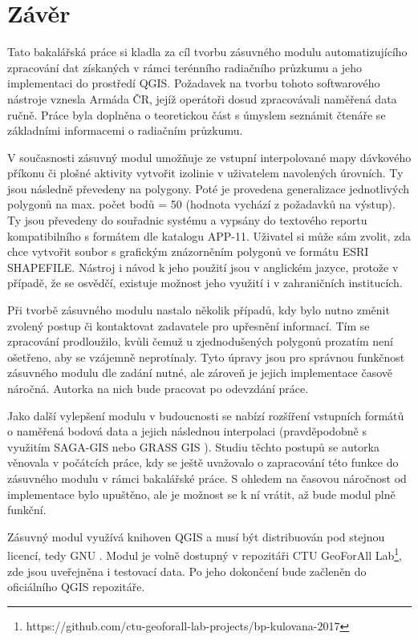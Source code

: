 \chapter{Závěr}
\label{5-zaver}


Tato bakalářská práce si kladla za cíl tvorbu zásuvného modulu
automatizujícího zpracování dat získaných v rámci terénního radiačního
průzkumu a jeho implementaci do prostředí QGIS. Požadavek na tvorbu
tohoto softwarového nástroje vznesla Armáda ČR, jejíž operátoři dosud
zpracovávali naměřená data ručně. Práce byla doplněna o teoretickou
část s úmyslem seznámit čtenáře se základními informacemi o radiačním
průzkumu.

V současnosti zásuvný modul umožňuje ze vstupní interpolované mapy
dávkového příkonu či plošné aktivity vytvořit izolinie v uživatelem
navolených úrovních. Ty jsou následně převedeny na polygony. Poté je
provedena generalizace jednotlivých polygonů na max. počet bodů = 50
(hodnota vychází z požadavků na výstup). Ty jsou převedeny do
souřadnic systému  a vypsány do textového reportu
kompatibilního s formátem dle katalogu APP-11. Uživatel si může sám
zvolit, zda chce vytvořit soubor s grafickým znázorněním polygonů ve
formátu ESRI SHAPEFILE. Nástroj i návod k jeho použití jsou v
anglickém jazyce, protože v případě, že se osvědčí, existuje možnost
jeho využití i v zahraničních institucích.

Při tvorbě zásuvného modulu nastalo několik případů, kdy bylo nutno
změnit zvolený postup či kontaktovat zadavatele pro upřesnění
informací. Tím se zpracování prodloužilo, kvůli čemuž u zjednodušených
polygonů prozatím není ošetřeno, aby se vzájemně neprotínaly. Tyto
úpravy jsou pro správnou funkčnost zásuvného modulu dle zadání nutné,
ale zároveň je jejich implementace časově náročná. Autorka na nich
bude pracovat po odevzdání práce.

Jako další vylepšení modulu v budoucnosti se nabízí rozšíření
vstupních formátů o naměřená bodová data a jejich následnou
interpolaci (pravděpodobně s využitím SAGA-GIS nebo GRASS GIS
). Studiu těchto postupů se autorka věnovala v počátcích
práce, kdy se ještě uvažovalo o zapracování této funkce do zásuvného
modulu v rámci bakalářské práce. S ohledem na časovou náročnost od
implementace bylo upuštěno, ale je možnost se k ní vrátit, až bude
modul plně funkční.

Zásuvný modul využívá knihoven QGIS a musí být distribuován pod
stejnou licencí, tedy GNU . Modul je volně dostupný v
repozitáři CTU GeoForAll
Lab\footnote{https://github.com/ctu-geoforall-lab-projects/bp-kulovana-2017},
zde jsou uveřejněna i testovací data. Po jeho dokončení bude začleněn
do oficiálního QGIS repozitáře.
